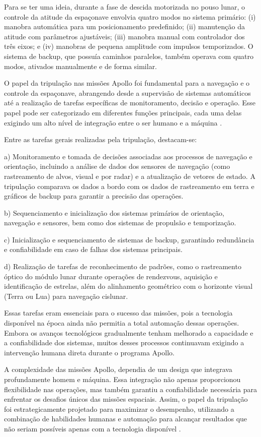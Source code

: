 Para se ter uma ideia, durante a fase de descida motorizada no pouso lunar, o controle da atitude da espaçonave envolvia quatro modos no sistema primário: (i) manobra automática para um posicionamento predefinido; (ii) manutenção da atitude com parâmetros ajustáveis; (iii) manobra manual com controlador dos três eixos; e (iv) manobras de pequena amplitude com impulsos temporizados. O sistema de backup, que possuía caminhos paralelos, também operava com quatro modos, ativados manualmente e de forma similar.

O papel da tripulação nas missões Apollo foi fundamental para a navegação e o controle da espaçonave, abrangendo desde a supervisão de sistemas automáticos até a realização de tarefas específicas de monitoramento, decisão e operação. Esse papel pode ser categorizado em diferentes funções principais, cada uma delas exigindo um alto nível de integração entre o ser humano e a máquina \cite{nevins1971}.

Entre as tarefas gerais realizadas pela tripulação, destacam-se:

a) Monitoramento e tomada de decisões associadas aos processos de navegação e orientação, incluindo a análise de dados dos sensores de navegação (como rastreamento de alvos, visual e por radar) e a atualização de vetores de estado. A tripulação comparava os dados a bordo com os dados de rastreamento em terra e gráficos de backup para garantir a precisão das operações.

b) Sequenciamento e inicialização dos sistemas primários de orientação, navegação e sensores, bem como dos sistemas de propulsão e temporização.

c) Inicialização e sequenciamento de sistemas de backup, garantindo redundância e confiabilidade em caso de falhas dos sistemas principais.

d) Realização de tarefas de reconhecimento de padrões, como o rastreamento óptico do módulo lunar durante operações de rendezvous, aquisição e identificação de estrelas, além do alinhamento geométrico com o horizonte visual (Terra ou Lua) para navegação cislunar.

Essas tarefas eram essenciais para o sucesso das missões, pois a tecnologia disponível na época ainda não permitia a total automação dessas operações. Embora os avanços tecnológicos gradualmente tenham melhorado a capacidade e a confiabilidade dos sistemas, muitos desses processos continuavam exigindo a intervenção humana direta durante o programa Apollo. 

A complexidade das missões Apollo, dependia de um design que integrava profundamente homem e máquina. Essa integração não apenas proporcionou flexibilidade nas operações, mas também garantiu a confiabilidade necessária para enfrentar os desafios únicos das missões espaciais. Assim, o papel da tripulação foi estrategicamente projetado para maximizar o desempenho, utilizando a combinação de habilidades humanas e automação para alcançar resultados que não seriam possíveis apenas com a tecnologia disponível \cite{nevins1971}.


